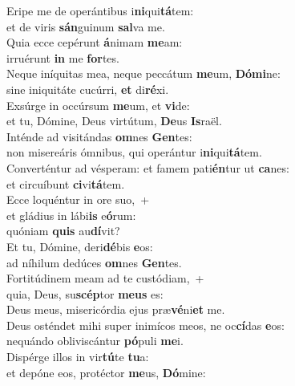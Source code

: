 \evenverse Eripe me de operántibus i\textbf{ni}qui\textbf{tá}tem:~\*\\
\evenverse et de viris \textbf{sán}guinum \textbf{sal}va me.\\
\oddverse Quia ecce cepérunt \textbf{á}nimam \textbf{me}am:~\*\\
\oddverse irruérunt \textbf{in} me \textbf{for}tes.\\
\evenverse Neque iníquitas mea, neque peccátum \textbf{me}um, \textbf{Dó}\textbf{mi}ne:~\*\\
\evenverse sine iniquitáte cucúrri, \textbf{et} di\textbf{ré}xi.\\
\oddverse Exsúrge in occúrsum \textbf{me}um, et \textbf{vi}de:~\*\\
\oddverse et tu, Dómine, Deus virtútum, \textbf{De}us \textbf{Is}raël.\\
\evenverse Inténde ad visitándas \textbf{om}nes \textbf{Gen}tes:~\*\\
\evenverse non misereáris ómnibus, qui operántur i\textbf{ni}qui\textbf{tá}tem.\\
\oddverse Converténtur ad vésperam: et famem pati\textbf{én}tur ut \textbf{ca}nes:~\*\\
\oddverse et circuíbunt \textbf{ci}vi\textbf{tá}tem.\\
\evenverse Ecce loquéntur in ore suo,~+\\
\evenverse  et gládius in lábi\textbf{is} e\textbf{ó}rum:~\*\\
\evenverse quóniam \textbf{quis} au\textbf{dí}vit?\\
\oddverse Et tu, Dómine, deri\textbf{dé}bis \textbf{e}os:~\*\\
\oddverse ad níhilum dedúces \textbf{om}nes \textbf{Gen}tes.\\
\evenverse Fortitúdinem meam ad te custódiam,~+\\
\evenverse  quia, Deus, su\textbf{scép}tor \textbf{me}\textbf{us} es:~\*\\
\evenverse Deus meus, misericórdia ejus præ\textbf{vé}ni\textbf{et} me.\\
\oddverse Deus osténdet mihi super inimícos meos, ne oc\textbf{cí}das \textbf{e}os:~\*\\
\oddverse nequándo obliviscántur \textbf{pó}puli \textbf{me}i.\\
\evenverse Dispérge illos in vir\textbf{tú}te \textbf{tu}a:~\*\\
\evenverse et depóne eos, protéctor \textbf{me}us, \textbf{Dó}mine:\\
